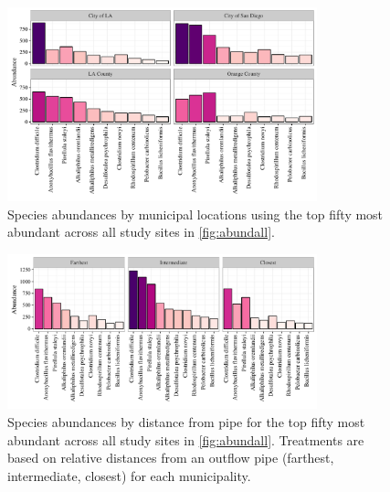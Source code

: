 \documentclass[letterpaper,12pt]{article}\usepackage[]{graphicx}\usepackage[]{color}
\newenvironment{knitrout}{}{} %
\begin{document}
\begin{knitrout}
\color{fgcolor}\begin{figure}[!ht]

{\centering \includegraphics[width=0.8\textwidth]{figs/abundmuni-1} 

}

\caption{Species abundances by municipal locations using the top fifty most abundant across all study sites in \cref{fig:abundall}.}\label{fig:abundmuni}
\end{figure}


\end{knitrout}
\clearpage

\begin{knitrout}
\color{fgcolor}\begin{figure}[!ht]

{\centering \includegraphics[width=0.8\textwidth]{figs/abundcont-1} 

}

\caption{Species abundances by distance from pipe for the top fifty most abundant across all study sites in \cref{fig:abundall}.  Treatments are based on relative distances from an outflow pipe (farthest, intermediate, closest) for each municipality.}\label{fig:abundcont}
\end{figure}


\end{knitrout}
\clearpage
\end{document}
